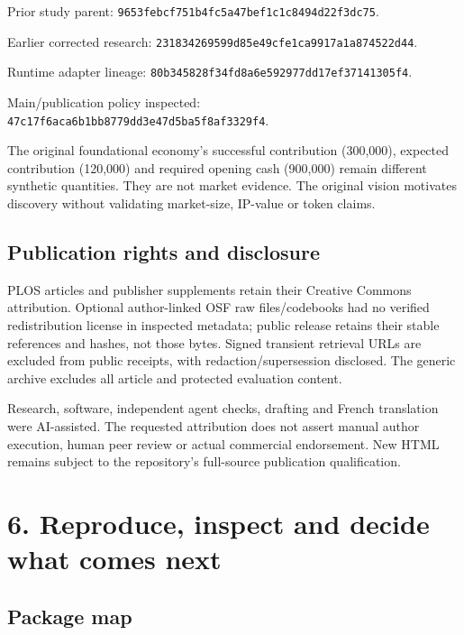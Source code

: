 \documentclass[10pt]{article}
\begin{document}
Prior study parent: \nolinkurl{9653febcf751b4fc5a47bef1c1c8494d22f3dc75}.

Earlier corrected research: \nolinkurl{231834269599d85e49cfe1ca9917a1a874522d44}.

Runtime adapter lineage: \nolinkurl{80b345828f34fd8a6e592977dd17ef37141305f4}.

Main/publication policy inspected: \nolinkurl{47c17f6aca6b1bb8779dd3e47d5ba5f8af3329f4}.

The original foundational economy's successful contribution (300,000), expected contribution (120,000) and required opening cash (900,000) remain different synthetic quantities. They are not market evidence. The original vision motivates discovery without validating market-size, IP-value or token claims.

\subsection*{Publication rights and disclosure}

PLOS articles and publisher supplements retain their Creative Commons attribution. Optional author-linked OSF raw files/codebooks had no verified redistribution license in inspected metadata; public release retains their stable references and hashes, not those bytes. Signed transient retrieval URLs are excluded from public receipts, with redaction/supersession disclosed. The generic archive excludes all article and protected evaluation content.

Research, software, independent agent checks, drafting and French translation were AI-assisted. The requested attribution does not assert manual author execution, human peer review or actual commercial endorsement. New HTML remains subject to the repository's full-source publication qualification.

\clearpage
\section*{6. Reproduce, inspect and decide what comes next}

\subsection*{Package map}
\end{document}
